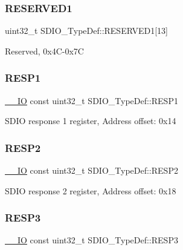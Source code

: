 \subsubsection{\texorpdfstring{R\+E\+S\+E\+R\+V\+E\+D1}{RESERVED1}}
{\footnotesize\ttfamily uint32\+\_\+t S\+D\+I\+O\+\_\+\+Type\+Def\+::\+R\+E\+S\+E\+R\+V\+E\+D1\mbox{[}13\mbox{]}}

Reserved, 0x4\+C-\/0x7C \mbox{\label{struct_s_d_i_o___type_def_a53f4c92d9a06bfee520718c82f0027b1}} 
\subsubsection{\texorpdfstring{R\+E\+S\+P1}{RESP1}}
{\footnotesize\ttfamily \hyperlink{core__sc300_8h_aec43007d9998a0a0e01faede4133d6be}{\+\_\+\+\_\+\+IO} const uint32\+\_\+t S\+D\+I\+O\+\_\+\+Type\+Def\+::\+R\+E\+S\+P1}

S\+D\+IO response 1 register, Address offset\+: 0x14 \mbox{\label{struct_s_d_i_o___type_def_af06e60089c11f9402d69a56aa828edda}} 
\subsubsection{\texorpdfstring{R\+E\+S\+P2}{RESP2}}
{\footnotesize\ttfamily \hyperlink{core__sc300_8h_aec43007d9998a0a0e01faede4133d6be}{\+\_\+\+\_\+\+IO} const uint32\+\_\+t S\+D\+I\+O\+\_\+\+Type\+Def\+::\+R\+E\+S\+P2}

S\+D\+IO response 2 register, Address offset\+: 0x18 \mbox{\label{struct_s_d_i_o___type_def_a51c8a77f72757a2c17d38b61ff13f356}} 
\subsubsection{\texorpdfstring{R\+E\+S\+P3}{RESP3}}
{\footnotesize\ttfamily \hyperlink{core__sc300_8h_aec43007d9998a0a0e01faede4133d6be}{\+\_\+\+\_\+\+IO} const uint32\+\_\+t S\+D\+I\+O\+\_\+\+Type\+Def\+::\+R\+E\+S\+P3}

